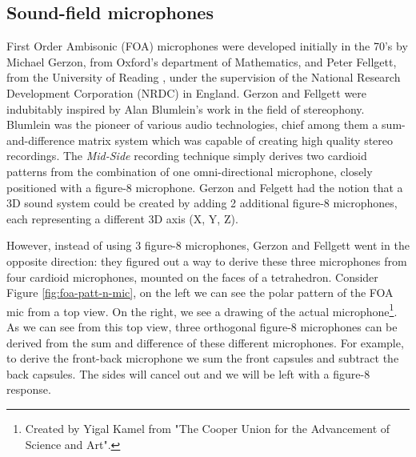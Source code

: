 \subsection{Sound-field microphones}

First Order Ambisonic (FOA) microphones were developed initially in the 70's by Michael Gerzon, from Oxford's department of Mathematics, and Peter Fellgett, from the University of Reading \cite{elen1991whatever}, under the supervision of the National Research Development Corporation (NRDC) in England. Gerzon and Fellgett were indubitably inspired by Alan Blumlein's work in the field of stereophony. Blumlein was the pioneer of various audio technologies, chief among them a sum-and-difference matrix system which was capable of creating high quality stereo recordings. The \textit{Mid-Side} recording technique simply derives two cardioid patterns from the combination of one omni-directional microphone, closely positioned with a figure-8 microphone. Gerzon and Felgett had the notion that a 3D sound system could be created by adding 2 additional figure-8 microphones, each representing a different 3D axis (X, Y, Z). 

However, instead of using 3 figure-8 microphones, Gerzon and Fellgett went in the opposite direction: they figured out a way to derive these three microphones from four cardioid microphones, mounted on the faces of a tetrahedron. Consider Figure \ref{fig:foa-patt-n-mic}, on the left we can see the polar pattern of the FOA mic from a top view. On the right, we see a drawing of the actual microphone\footnote{Created by Yigal Kamel from "The Cooper Union for the Advancement of Science and Art".}. As we can see from this top view, three orthogonal figure-8 microphones can be derived from the sum and difference of these different microphones. For example, to derive the front-back microphone we sum the front capsules and subtract the back capsules. The sides will cancel out and we will be left with a figure-8 response. 

